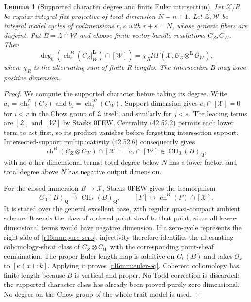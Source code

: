 \documentclass[11pt,a4paper]{article}
\newtheorem{lemma}[theorem]{Lemma}
\theoremstyle{definition}
\theoremstyle{remark}
\numberwithin{equation}{section}
\begin{document}
\begin{lemma}[Supported character degree and finite Euler intersection]
\label{r16mm:euler}
Let $\mathcal X/R$ be regular integral flat projective of total
dimension $N=n+1$. Let $\mathcal Z,\mathcal W$ be integral
model cycles of codimensions $r,s$ with $r+s=N$, whose generic
fibers are disjoint. Put $B=\mathcal Z\cap\mathcal W$ and
choose finite vector-bundle resolutions $C_Z,C_W$. Then
\[
 \deg_k\left(\operatorname{ch}_r^B
          (C_Z|^{\mathbf L}_{\mathcal W})\cap[\mathcal W]\right)
 =\chi_R R\Gamma\left(\mathcal X,
         \mathcal O_{\mathcal Z}\otimes^{\mathbf L}
                                   \mathcal O_{\mathcal W}\right),
 \tag{MM16.7}\label{r16mm:euler-eq}
\]
where $\chi_R$ is the alternating sum of finite $R$-lengths.
The intersection $B$ may have positive dimension.
\end{lemma}

\begin{proof}
We compute the supported character before taking its degree.
Write $a_i=\operatorname{ch}_i^{\mathcal Z}(C_Z)$ and
$b_j=\operatorname{ch}_j^{\mathcal W}(C_W)$.
Support dimension gives $a_i\cap[\mathcal X]=0$ for $i<r$
in the Chow group of $\mathcal Z$ itself, and similarly for
$j<s$. The leading terms are $[\mathcal Z]$ and
$[\mathcal W]$ by Stacks 0FEW. Centrality (42.52.2) permits
each lower term to act first, so its product vanishes before
forgetting intersection support. Intersected-support
multiplicativity (42.52.6) consequently gives
\[
 \operatorname{ch}^B(C_Z\otimes C_W)\cap[\mathcal X]
  =a_r\cap[\mathcal W]\in\operatorname{CH}_0(B)_{\mathbf Q},
 \tag{MM16.8}\label{r16mm:pure-zero}
\]
with no other-dimensional terms: total degree below $N$ has
a lower factor, and total degree above $N$ has negative output
dimension.

For the closed immersion $B\to\mathcal X$, Stacks 0FEW gives
the isomorphism
\[
 G_0(B)_{\mathbf Q}\xrightarrow{\sim}\operatorname{CH}_*(B)_{\mathbf Q},
 \qquad [F]\longmapsto
           \operatorname{ch}^B(F)\cap[\mathcal X].
\]
It is stated over the general excellent base, with regular
quasi-compact ambient scheme. It sends the class of a closed
point sheaf to that point, since all lower-dimensional terms
would have negative dimension. If a zero-cycle represents the
right side of \eqref{r16mm:pure-zero}, injectivity therefore
identifies the alternating cohomology-sheaf class of
$C_Z\otimes C_W$ with the corresponding point-sheaf combination.
The proper Euler-length map is additive on $G_0(B)$ and takes
$\mathcal O_x$ to $[\kappa(x):k]$. Applying it proves
\eqref{r16mm:euler-eq}. Coherent cohomology has finite length
because $B$ is vertical and proper. No Todd correction is
discarded: the supported character class has already been
proved purely zero-dimensional. No degree on the Chow group of
the whole trait model is used.
\end{proof}
\end{document}
